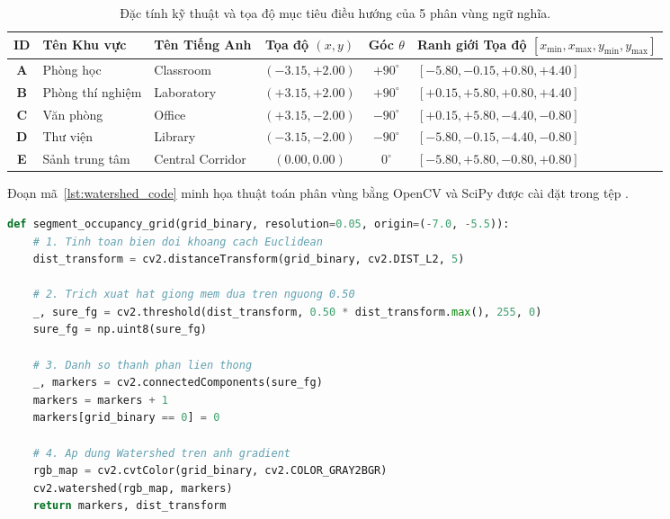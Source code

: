 \begin{table}[H]
\centering
\small
\caption{Đặc tính kỹ thuật và tọa độ mục tiêu điều hướng của 5 phân vùng ngữ nghĩa.}
\label{tab:zones_specs}
\begin{tabular}{@{}c p{2.6cm} p{2.6cm} c c p{4.6cm}@{}}
\toprule
\textbf{ID} & \textbf{Tên Khu vực} & \textbf{Tên Tiếng Anh} & \textbf{Tọa độ $(x, y)$} & \textbf{Góc $\theta$} & \textbf{Ranh giới Tọa độ} $[x_{\min}, x_{\max}, y_{\min}, y_{\max}]$ \\
\midrule
\textbf{A} & Phòng học & Classroom & $(-3.15, +2.00)$ & $+90^\circ$ & $[-5.80, -0.15, +0.80, +4.40]$ \\
\textbf{B} & Phòng thí nghiệm & Laboratory & $(+3.15, +2.00)$ & $+90^\circ$ & $[+0.15, +5.80, +0.80, +4.40]$ \\
\textbf{C} & Văn phòng & Office & $(+3.15, -2.00)$ & $-90^\circ$ & $[+0.15, +5.80, -4.40, -0.80]$ \\
\textbf{D} & Thư viện & Library & $(-3.15, -2.00)$ & $-90^\circ$ & $[-5.80, -0.15, -4.40, -0.80]$ \\
\textbf{E} & Sảnh trung tâm & Central Corridor & $(0.00, 0.00)$ & $0^\circ$ & $[-5.80, +5.80, -0.80, +0.80]$ \\
\bottomrule
\end{tabular}
\end{table}

Đoạn mã~\ref{lst:watershed_code} minh họa thuật toán phân vùng bằng OpenCV và SciPy được cài đặt trong tệp .

\begin{lstlisting}[language=Python,caption={Cài đặt thuật toán phân vùng Watershed trong \code{map_segmentation.py}.},label={lst:watershed_code}]
def segment_occupancy_grid(grid_binary, resolution=0.05, origin=(-7.0, -5.5)):
    # 1. Tinh toan bien doi khoang cach Euclidean
    dist_transform = cv2.distanceTransform(grid_binary, cv2.DIST_L2, 5)
    
    # 2. Trich xuat hat giong mem dua tren nguong 0.50
    _, sure_fg = cv2.threshold(dist_transform, 0.50 * dist_transform.max(), 255, 0)
    sure_fg = np.uint8(sure_fg)
    
    # 3. Danh so thanh phan lien thong
    _, markers = cv2.connectedComponents(sure_fg)
    markers = markers + 1
    markers[grid_binary == 0] = 0
    
    # 4. Ap dung Watershed tren anh gradient
    rgb_map = cv2.cvtColor(grid_binary, cv2.COLOR_GRAY2BGR)
    cv2.watershed(rgb_map, markers)
    return markers, dist_transform
\end{lstlisting}
